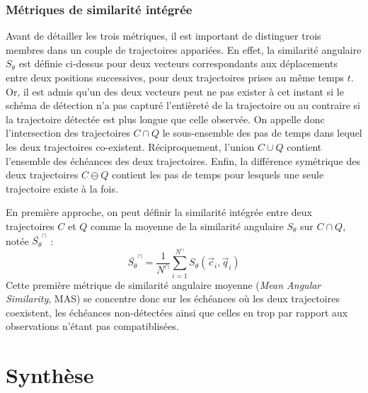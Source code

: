 \documentclass[../main.tex]{subfiles}
\begin{document}
\subsubsection*{Métriques de similarité intégrée}

Avant de détailler les trois métriques, il est important de distinguer trois membres dans un couple de trajectoires appariées. En effet, la similarité angulaire
$S_\theta$ est définie ci-dessus pour deux vecteurs correspondants aux déplacements entre deux positions successives, pour deux trajectoires prises au même
temps $t$. Or, il est admis qu'un des deux vecteurs peut ne pas exister à cet instant si le schéma de détection n'a pas capturé l'entièreté de la trajectoire
ou au contraire si la trajectoire détectée est plus longue que celle observée. On appelle donc l'intersection des trajectoires $C \cap Q$ le sous-ensemble des
pas de temps dans lequel les deux trajectoires co-existent. Réciproquement, l'union $C \cup Q$ contient l'ensemble des échéances des deux trajectoires. Enfin,
la différence symétrique des deux trajectoires $C \ominus Q$ contient les pas de temps pour lesquels une seule trajectoire existe à la fois.

En première approche, on peut définir la similarité intégrée entre deux trajectoires $C$ et $Q$ comme la moyenne de la similarité angulaire $S_\theta$ sur $C
\cap Q$, notée $\bar{S_\theta}^\cap$ :
%
\begin{equation}
    \bar{S_\theta}^\cap = \frac{1}{N^\cap} \sum_{i=1}^{N^\cap} S_\theta (\vec{c}_i, \vec{q}_i)
\end{equation}
%
Cette première métrique de similarité angulaire moyenne (\textit{Mean Angular Similarity}, MAS) se concentre donc sur les échéances où les deux trajectoires
coexistent, les échéances non-détectées ainsi que celles en trop par rapport aux observations n'étant pas compatiblisées.


\section{Synthèse}
\end{document}
